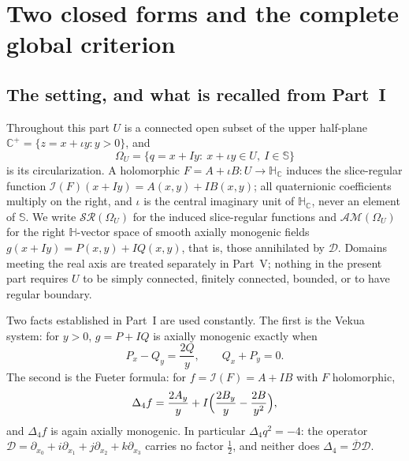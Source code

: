 \documentclass[11pt,a4paper]{article}
\numberwithin{equation}{section}
\theoremstyle{definition}
\theoremstyle{remark}
\theoremstyle{plain}
\newcommand{\HH}{\mathbb H}
\newcommand{\HC}{\mathbb H_{\mathbb C}}
\newcommand{\CC}{\mathbb C}
\newcommand{\SSS}{\mathbb S}
\newcommand{\Cplus}{\CC^{+}}
\newcommand{\Dop}{\mathcal D}
\newcommand{\lap}{\Delta_4}
\newcommand{\I}{\mathcal I}
\newcommand{\SR}{\mathcal{SR}}
\newcommand{\AM}{\mathcal{AM}}
\newcommand{\Om}{\Omega}
\newcommand{\Aff}{\mathrm{Aff}_{\HH}}
\newcommand{\Omom}{\mathcal O_{\mathrm{mom}}}
\newcommand{\om}{\omega}
\newcommand{\thet}{\theta}
\newcommand{\etaC}{\eta_{C}}
\newcommand{\pot}{C}          %
\newcommand{\potV}{V}         %
\newcommand{\Hg}{\mathcal H_{g}}      %
\begin{document}


\section{Two closed forms and the complete global criterion}
\label{b:sec:forms}

\subsection{The setting, and what is recalled from Part~I}
\label{b:sub:setting}

Throughout this part $U$ is a connected open subset of the upper half-plane
$\Cplus=\{z=x+\iota y:y>0\}$, and
\[
 \Om_U=\{q=x+Iy:\ x+\iota y\in U,\ I\in\SSS\}
\]
is its circularization.  A holomorphic $F=A+\iota B:U\to\HC$ induces the
slice-regular function $\I(F)(x+Iy)=A(x,y)+IB(x,y)$; all quaternionic
coefficients multiply on the right, and $\iota$ is the central imaginary unit
of $\HC$, never an element of $\SSS$.  We write $\SR(\Om_U)$ for the induced
slice-regular functions and $\AM(\Om_U)$ for the right $\HH$-vector space of
smooth axially monogenic fields $g(x+Iy)=P(x,y)+IQ(x,y)$, that is, those
annihilated by $\Dop$.  Domains meeting the real axis are treated separately
in Part~V; nothing in the present part requires $U$ to be simply connected,
finitely connected, bounded, or to have regular boundary.

Two facts established in Part~I are used constantly.  The first is the Vekua
system: for $y>0$, $g=P+IQ$ is axially monogenic exactly when
\begin{equation}
 P_x-Q_y=\frac{2Q}{y},\qquad Q_x+P_y=0.
 \label{b:vekua}
\end{equation}
The second is the Fueter formula: for $f=\I(F)=A+IB$ with $F$ holomorphic,
\begin{equation}
 \lap f=\frac{2A_y}{y}+I\Bigl(\frac{2B_y}{y}-\frac{2B}{y^2}\Bigr),
 \label{b:fueter}
\end{equation}
and $\lap f$ is again axially monogenic.  In particular $\lap q^2=-4$: the
operator $\Dop=\partial_{x_0}+i\partial_{x_1}+j\partial_{x_2}+k\partial_{x_3}$
carries no factor $\tfrac12$, and neither does $\lap=\overline{\Dop}\Dop$.
\end{document}
